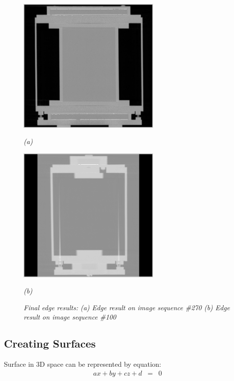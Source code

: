 \begin{figure}[htb]
  \begin{minipage}[b]{2.75in}
    \centering
    \centerline{\mbox{\includegraphics[width=2.75in]{data_extraction/images/sample/20121017_270/Coronal/result.eps}}}
    \centerline{\emph{(a)}}
  \end{minipage}
  \begin{minipage}[b]{2.75in}
    \centering
    \centerline{\mbox{\includegraphics[width=2.75in]{data_extraction/images/sample/20121017_100/Coronal/result_canny_[0.001,0.002].eps}}}
    \centerline{\emph{(b)}}
  \end{minipage}
  \caption{\emph{Final edge results: (a) Edge result on image sequence \#270 (b) Edge result on image sequence \#100}}
  \label{fig:coronal_edge_final_result}
\end{figure}


\subsection{Creating Surfaces}

Surface in 3D space can be represented by equation:
\begin{eqnarray}
ax + by + cz + d & = & 0 \label{eq:plane}
\end{eqnarray}

